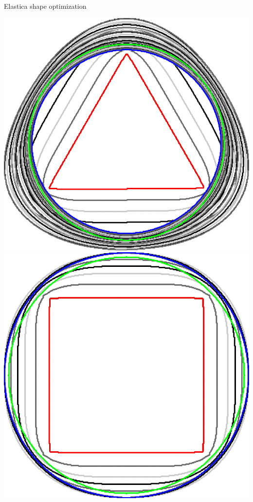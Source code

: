 \begin{frame}
{Elastica shape optimization}

\begin{minipage}{0.25\textwidth}
\center
\includegraphics[scale=0.06]{figures/elastica-minimization/with-neighborhood-flow/radius_16/triangle.png}\\[1em]
\includegraphics[scale=0.06]{figures/elastica-minimization/with-neighborhood-flow/radius_16/square.png}\\[1em]

\end{minipage}
\end{frame}
